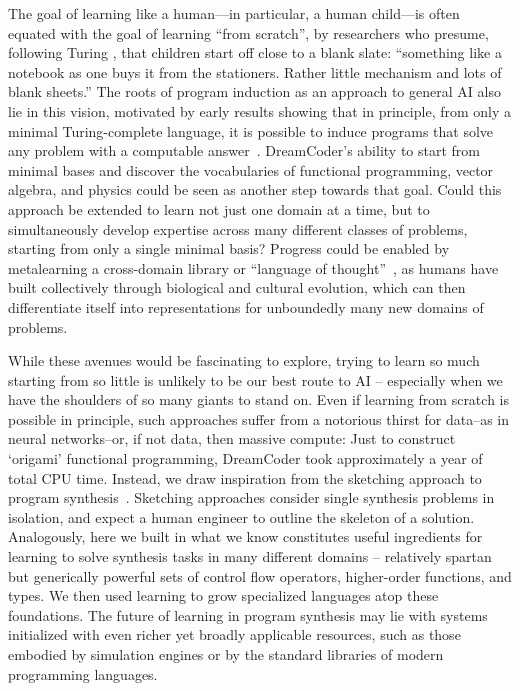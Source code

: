 \documentclass[12pt]{article}
\begin{document}
The goal of learning like a human---in particular, a human child---is often equated with the goal of learning ``from scratch'', by researchers who presume, following Turing \cite{turing50}, that children start off close to a blank slate: ``something like a notebook as one buys it from the stationers. Rather little mechanism and lots of blank sheets.''  The roots of program induction as an approach to general AI also lie in this vision, motivated by early results showing that in principle, from only a minimal Turing-complete language, it is possible to induce programs that solve any problem with a computable answer~\cite{solomonoff1964formal,solomonoff1989system, schmidhuber2004optimal,hutter2004universal}. 
DreamCoder's ability to start from minimal bases and discover the vocabularies of functional programming, vector algebra, and physics could be seen as another step towards that goal. Could this approach be extended to learn not just one domain at a time, but to simultaneously develop expertise across many different classes of problems, starting from only a %
single minimal basis? 
Progress could be enabled by metalearning a cross-domain library or ``language of thought''~\cite{fodor1975language,piantadosi2011learning}, %
as humans have built collectively through biological and cultural evolution, which can then differentiate itself into
representations for unboundedly many new domains of problems.

While these avenues would be fascinating to explore, %
trying to learn so much starting from so little is unlikely to be our best route to AI -- especially when we have the shoulders of so many giants to stand on.
Even if learning from scratch is possible in principle, such approaches suffer from a notorious thirst for data--as in neural networks--or, if not data, then massive compute: Just to construct `origami' functional programming, DreamCoder took approximately a year of total CPU time.   Instead, we draw inspiration from the sketching approach to program synthesis~\cite{solar2008program}. Sketching approaches consider single synthesis problems in isolation, and expect a human engineer to outline the skeleton of a solution. Analogously, here we built in what we know constitutes useful ingredients for %
learning to solve %
synthesis tasks in many different domains -- relatively spartan but generically powerful sets of control flow operators, higher-order functions, and types. We then used learning to grow specialized languages atop these foundations.  The future of learning in program synthesis may lie with systems initialized %
with even richer yet broadly applicable resources, such as those embodied by simulation engines or by the standard libraries of modern programming languages.
\end{document}
